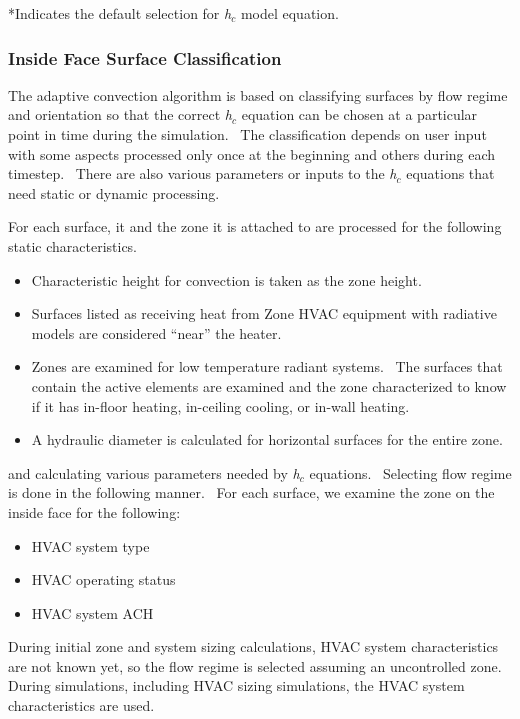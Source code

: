 *Indicates the default selection for \emph{h\(_{c}\)} model equation.

\subsubsection{Inside Face Surface Classification}\label{inside-face-surface-classification}

The adaptive convection algorithm is based on classifying surfaces by flow regime and orientation so that the correct \emph{h\(_{c}\)} equation can be chosen at a particular point in time during the simulation.~ The classification depends on user input with some aspects processed only once at the beginning and others during each timestep.~ There are also various parameters or inputs to the \emph{h\(_{c}\)} equations that need static or dynamic processing.

For each surface, it and the zone it is attached to are processed for the following static characteristics.

\begin{itemize}
\item
  Characteristic height for convection is taken as the zone height.
\item
  Surfaces listed as receiving heat from Zone HVAC equipment with radiative models are considered ``near'' the heater.
\item
  Zones are examined for low temperature radiant systems.~ The surfaces that contain the active elements are examined and the zone characterized to know if it has in-floor heating, in-ceiling cooling, or in-wall heating.
\item
  A hydraulic diameter is calculated for horizontal surfaces for the entire zone.
\end{itemize}

and calculating various parameters needed by \emph{h\(_{c}\)} equations.~ Selecting flow regime is done in the following manner.~ For each surface, we examine the zone on the inside face for the following:

\begin{itemize}
\item
  HVAC system type
\item
  HVAC operating status
\item
  HVAC system ACH
\end{itemize}

During initial zone and system sizing calculations, HVAC system characteristics are not known yet, so the flow regime is selected assuming an uncontrolled zone. During simulations, including HVAC sizing simulations, the HVAC system characteristics are used.

